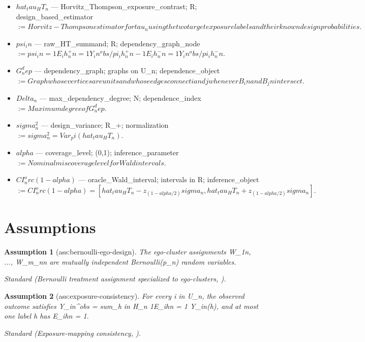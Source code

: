 \documentclass{article}
\newtheorem{assumption}{Assumption}
\begin{document}
\begin{itemize}
  \item $hat_tau_HT_n$ --- Horvitz_Thompson_exposure_contrast; R; design_based_estimator $:= Horvitz-Thompson estimator for tau_n using the two target exposure labels and their known design probabilities.$
  \item $psi_in$ --- raw_HT_summand; R; dependency_graph_node $:= psi_in = 1{E_ih_n^+n = 1} Y_in^obs / pi_ih_n^+n - 1{E_ih_n^-n = 1} Y_in^obs / pi_ih_n^-n.$
  \item $G_n^dep$ --- dependency_graph; graphs on U_n; dependence_object $:= Graph whose vertices are units and whose edges connect i and j whenever B_in and B_jn intersect.$
  \item $Delta_n$ --- max_dependency_degree; N; dependence_index $:= Maximum degree of G_n^dep.$
  \item $sigma_n^2$ --- design_variance; R_+; normalization $:= sigma_n^2 = Var_pi(hat_tau_HT_n).$
  \item $alpha$ --- coverage_level; (0,1); inference_parameter $:= Nominal miscoverage level for Wald intervals.$
  \item $CI_n^orc(1-alpha)$ --- oracle_Wald_interval; intervals in R; inference_object $:= CI_n^orc(1-alpha) = [hat_tau_HT_n - z_(1-alpha/2) sigma_n, hat_tau_HT_n + z_(1-alpha/2) sigma_n].$
\end{itemize}

\section{Assumptions}

\begin{assumption}[ass:bernoulli-ego-design]\label{ass:bernoulli-ego-design}
The ego-cluster assignments W_1n, ..., W_m_nn are mutually independent Bernoulli(p_n) random variables.
\par\smallskip\noindent\emph{Standard} (Bernoulli treatment assignment specialized to ego-clusters, \cite{AronowSamii2017}).
\end{assumption}

\begin{assumption}[ass:exposure-consistency]\label{ass:exposure-consistency}
For every i in U_n, the observed outcome satisfies Y_in^obs = sum_{h in H_n} 1{E_ihn = 1} Y_in(h), and at most one label h has E_ihn = 1.
\par\smallskip\noindent\emph{Standard} (Exposure-mapping consistency, \cite{AronowSamii2017}).
\end{assumption}
\end{document}
